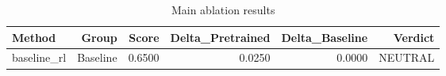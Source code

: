 \begin{table}[htbp]
\centering
\caption{Main ablation results}
\label{tab:main-results}
\begin{tabular}{lrrrrr}
\toprule
\textbf{Method} & \textbf{Group} & \textbf{Score} & \textbf{Delta\_Pretrained} & \textbf{Delta\_Baseline} & \textbf{Verdict} \\
\midrule
baseline\_rl & Baseline & 0.6500 & 0.0250 & 0.0000 & NEUTRAL \\
\bottomrule
\end{tabular}
\end{table}